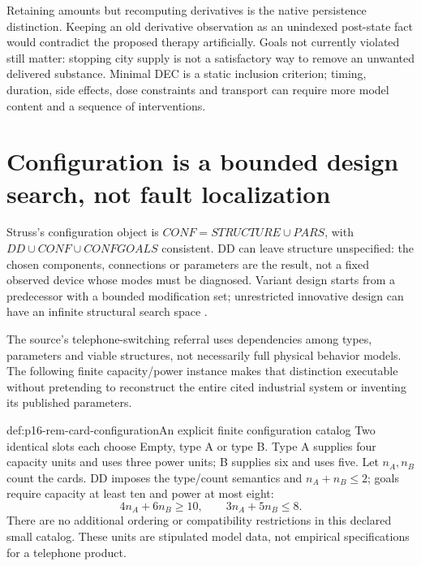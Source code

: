 Retaining amounts but recomputing derivatives is the native persistence
distinction. Keeping an old derivative observation as an unindexed post-state
fact would contradict the proposed therapy artificially. Goals not currently
violated still matter: stopping city supply is not a satisfactory way to
remove an unwanted delivered substance. Minimal DEC is a static inclusion
criterion; timing, duration, side effects, dose constraints and transport
can require more model content and a sequence of interventions.

\section{Configuration is a bounded design search, not fault localization}
\label{sec:p16-rem-configuration}

Struss's configuration object is \(CONF=STRUCTURE\cup PARS\),
with \(DD\cup CONF\cup CONFGOALS\) consistent. DD can leave
structure unspecified: the chosen components, connections or parameters
are the result, not a fixed observed device whose modes must be diagnosed.
Variant design starts from a predecessor with a bounded modification set;
unrestricted innovative design can have an infinite structural search space
\cite[Definition~10.22, pp.~455--456]{Struss2008ModelBasedProblemSolving}.

The source's telephone-switching referral uses dependencies among types,
parameters and viable structures, not necessarily full physical behavior
models. The following finite capacity/power instance makes that distinction
executable without pretending to reconstruct the entire cited industrial
system or inventing its published parameters.

\begin{hbdefinition}{def:p16-rem-card-configuration}{An explicit finite configuration catalog}
Two identical slots each choose Empty, type A or type B. Type A supplies
four capacity units and uses three power units; B supplies six and uses
five. Let \(n_A,n_B\) count the cards. DD imposes the type/count semantics
and \(n_A+n_B\le2\); goals require capacity at least ten and power
at most eight:
\[
 4n_A+6n_B\ge10,\qquad3n_A+5n_B\le8.
\]
There are no additional ordering or compatibility restrictions in this
declared small catalog. These units are stipulated model data, not empirical
specifications for a telephone product.
\end{hbdefinition}


